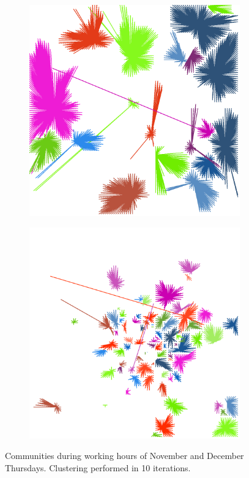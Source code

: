\documentclass[12pt,a4paper]{article}
\begin{document}
\begin{figure}[H]
\begin{subfigure}[b]{0.3\textwidth}
\end{subfigure}
\begin{subfigure}[b]{0.3\textwidth}
\includegraphics[width=\textwidth]{weekDef/edges-4Thu-mid.png}
\end{subfigure}
\begin{subfigure}[b]{0.3\textwidth}
\includegraphics[width=\textwidth]{weekDef/edges-4Thu-small.png}
\end{subfigure}

\caption{Communities during working hours of November and December Thursdays. Clustering performed in 10 iterations.}
\label{fig:thursdayworking}
\end{figure}
\end{document}
